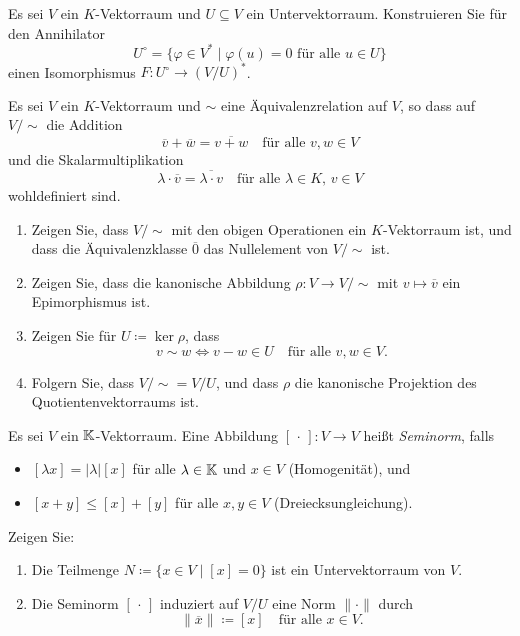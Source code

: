 \begin{question}
  Es sei $V$ ein $K$-Vektorraum und $U \subseteq V$ ein Untervektorraum.
  Konstruieren Sie für den Annihilator
  \[
      U^\circ
    = \{ \varphi \in V^* \mid \text{$\varphi(u) = 0$ für alle $u \in U$} \}
  \]
  einen Isomorphismus $F \colon U^\circ \to (V\!/U)^*$.
\end{question}


\begin{question}
  Es sei $V$ ein $K$-Vektorraum und $\sim$ eine Äquivalenzrelation auf $V$, so dass auf $V/{\sim}$ die Addition
  \[
      \overline{v} + \overline{w}
    = \overline{v + w}
    \quad
    \text{für alle $v, w \in V$}
  \]
  und die Skalarmultiplikation
  \[
      \lambda \cdot \overline{v}
    = \overline{\lambda \cdot v}
    \quad
    \text{für alle $\lambda \in K$, $v \in V$}
  \]
  wohldefiniert sind.
  \begin{enumerate}[leftmargin=*]
    \item
      Zeigen Sie, dass $V\!/{\sim}$ mit den obigen Operationen ein $K$-Vektorraum ist, und dass die Äquivalenzklasse $\overline{0}$ das Nullelement von $V/{\sim}$ ist.
    \item
      Zeigen Sie, dass die kanonische Abbildung $\rho \colon V \to V/{\sim}$ mit $v \mapsto \overline{v}$ ein Epimorphismus ist.
    \item
      Zeigen Sie für $U \coloneqq \ker \rho$, dass
      \[
        v \sim w
        \iff
        v - w \in U
        \quad
        \text{für alle $v, w \in V$}.
      \]
    \item
      Folgern Sie, dass $V/{\sim} = V/U$, und dass $\rho$ die kanonische Projektion des Quotientenvektorraums ist.
  \end{enumerate}
\end{question}


\begin{question}
  Es sei $V$ ein $\mathbb{K}$-Vektorraum.
  Eine Abbildung $[\,\cdot\,] \colon V \to V$ heißt \emph{Seminorm}, falls
  \begin{itemize}
    \item
      $[\lambda x] = |\lambda| [x]$ für alle $\lambda \in \mathbb{K}$ und $x \in V$ (Homogenität), und
    \item
      $[x + y] \leq [x] + [y]$ für alle $x, y \in V$ (Dreiecksungleichung).
  \end{itemize}
  Zeigen Sie:
  \begin{enumerate}[leftmargin=*]
    \item
      Die Teilmenge $N \coloneqq \{x \in V \mid [x] = 0\}$ ist ein Untervektorraum von $V$.
    \item
      Die Seminorm $[\,\cdot\,]$ induziert auf $V\!/U$ eine Norm $\|\cdot\|$ durch
      \[
        \| \overline{x} \| \coloneqq [x]
        \quad
        \text{für alle $x \in V$}.
      \]
  \end{enumerate}
\end{question}


